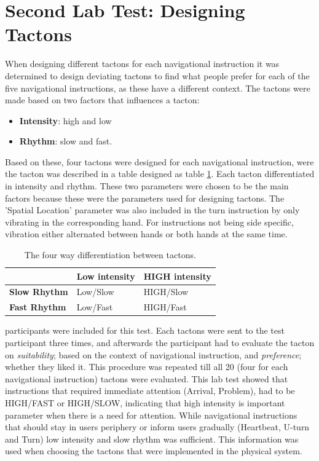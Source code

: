\documentclass{sigchi}
\begin{document}
\section{Second Lab Test: Designing Tactons}
When designing different tactons for each navigational instruction it was determined to design deviating tactons to find what people prefer for each of the five navigational instructions, as these have a different context. The tactons were made based on two factors that influences a tacton:
\begin{itemize}
\item \textbf{Intensity}: high and low 
\item \textbf{Rhythm}: slow and fast.
\end{itemize}
Based on these, four tactons were designed for each navigational instruction, were the tacton was described in a table designed as table \ref{tab:stage_two_tacton_design}. Each tacton differentiated in intensity and rhythm. These two parameters were chosen to be the main factors because these were the parameters used for designing tactons. The 'Spatial Location' parameter was also included in the turn instruction by only vibrating in the corresponding hand. For instructions not being side specific, vibration either alternated between hands or both hands at the same time. 
\begin{table}[!b]
\centering
\small
\begin{tabular} {p{2.0cm}p{2.0cm}p{2.0cm}}
\toprule
 & \textbf{Low intensity} & \textbf{HIGH intensity}  
\tabularnewline 
\midrule
\textbf{Slow Rhythm} & Low/Slow & HIGH/Slow  
\vspace{0.1cm} \tabularnewline
\textbf{Fast Rhythm} & Low/Fast & HIGH/Fast 
\vspace{0.1cm} 
\tabularnewline
\bottomrule
\end{tabular}
\caption{The four way differentiation between tactons.}
\label{tab:stage_two_tacton_design}
\end{table}
\noindent
\newline
{} participants were included for this test. Each tactons were sent to the test participant three times, and afterwards the participant had to evaluate the tacton on \textit{suitability}; based on the context of navigational instruction, and \textit{preference}; whether they liked it. This procedure was repeated till all 20 (four for each navigational instruction) tactons were evaluated.
\newline
\newline
This lab test showed that instructions that required immediate attention (Arrival, Problem), had to be HIGH/FAST or HIGH/SLOW, indicating that high intensity is important parameter when there is a need for attention. 
While navigational instructions that should stay in users periphery or inform users gradually (Heartbeat, U-turn and Turn) low intensity and slow rhythm was sufficient. This information was used when choosing the tactons that were implemented in the physical system.  
\end{document}
